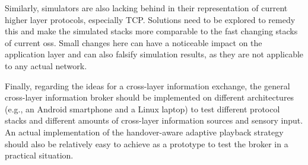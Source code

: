 Similarly, simulators are also lacking behind in their representation of current higher layer protocols, especially \gls{TCP}. Solutions need to be explored to remedy this and make the simulated stacks more comparable to the fast changing stacks of current \glspl{os}. Small changes here can have a noticeable impact on the application layer and can also falsify simulation results, as they are not applicable to any actual network.

Finally, regarding the ideas for a cross-layer information exchange, the general cross-layer information broker should be implemented on different architectures (e.g., an Android smartphone and a Linux laptop) to test different protocol stacks and different amounts of cross-layer information sources and sensory input. An actual implementation of the handover-aware adaptive playback strategy should also be relatively easy to achieve as a prototype to test the broker in a practical situation.





